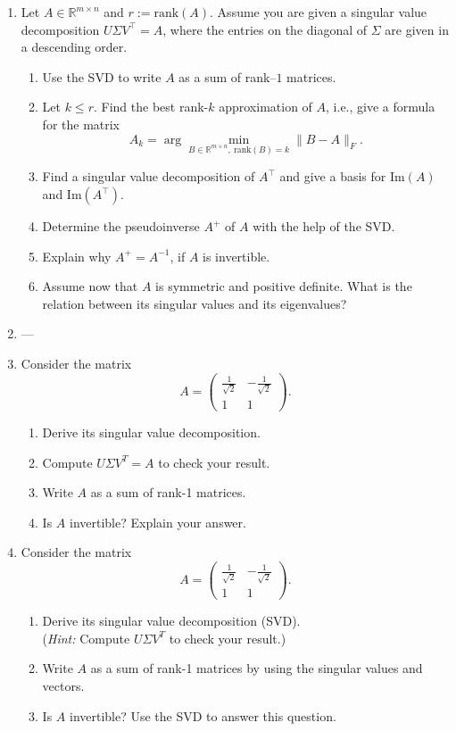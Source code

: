 \begin{enumerate}
	\item Let $A \in \mathbb{R}^{m \times n}$ and $r:=\text{rank}(A)$. Assume you are given a singular value decomposition 
	$U \Sigma V^\top = A$, where the 
	entries on the diagonal of $\Sigma$ are given in a descending order.
	\begin{enumerate}
			\item Use the SVD to write $A$ as a sum of rank--$1$ matrices.
		\item Let $k \leq r$. Find the best rank-$k$ approximation of $A$, i.e., give a formula for the matrix
		$$A_k = \arg \min_{B \in  \mathbb{R}^{m \times n},~ \text{rank}(B)=k  } \|B-A\|_F.$$ 
		\item Find a singular value decomposition of $A^\top$ and give a basis for $\text{Im}(A)$ and $\text{Im}(A^\top)$.		
		\item Determine the pseudoinverse $A^+$ of $A$ with the help of the SVD. 
		\item Explain why $A^+ = A^{-1}$, if $A$ is invertible.
		\item Assume now that $A$ is symmetric and positive definite. What is the relation between its singular values and its eigenvalues?
	\end{enumerate}
\item ---
\item Consider the matrix
$$A = \begin{pmatrix}
\frac{1}{\sqrt{2}} &-\frac{1}{\sqrt{2}}\\
1&1
\end{pmatrix}.$$
\begin{enumerate}
	\item Derive its singular value decomposition.
	\item Compute $U\Sigma V^T = A$ to check your result.
	\item Write $A$ as a sum of rank-1 matrices.
	\item Is $A$ invertible? Explain your answer.
\end{enumerate}
\item Consider the matrix
$$A = \begin{pmatrix}
\frac{1}{\sqrt{2}} &-\frac{1}{\sqrt{2}}\\
1&1
\end{pmatrix}.$$	
\begin{enumerate}
	\item Derive its singular value decomposition (SVD).\\
	(\textit{Hint:} Compute $U\Sigma V^T$ to check your result.)
	\item Write $A$ as a sum of rank-1 matrices by using the singular values and vectors.
	\item Is $A$ invertible? Use the SVD to answer this question.
\end{enumerate}
\end{enumerate}
 